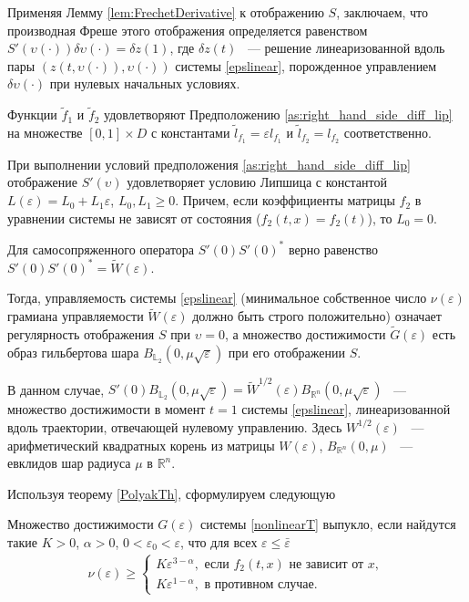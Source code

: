 \documentclass[../main.tex]{subfiles}
\begin{document}
 Применяя Лемму \ref{lem:FrechetDerivative} к отображению $S$, заключаем, что производная Фреше этого отображения определяется равенством $ S'(\upsilon(\cdot))\delta \upsilon(\cdot) = \delta z(1)$, где $\delta z(t)$ ~--- решение линеаризованной вдоль пары $\left( z(t,\upsilon(\cdot)),\upsilon(\cdot)\right)  $ системы \eqref{epslinear}, порожденное управлением $\delta \upsilon(\cdot)$ при нулевых начальных условиях.
 
  Функции  $\widetilde{f}_1$ и $\widetilde{f}_2$ удовлетворяют Предположению \ref{as:right_hand_side_diff_lip} на множестве $[0, 1]\times D$ с константами $\widetilde{l}_{f_1} = \varepsilon l_{f_1} $ и  $\widetilde{l}_{f_2} = l_{f_2} $ соответственно. 
 
 
 При выполнении условий предположения \ref{as:right_hand_side_diff_lip} отображение $S'(\upsilon)$ удовлетворяет условию Липшица с константой $L(\varepsilon) = L_0 + L_1\varepsilon$, $ L_0, L_1 \geqslant 0 $. Причем, если коэффициенты матрицы $f_2$ в уравнении системы не зависят от состояния ($f_2(t,x) = f_2(t)$), то $L_0 = 0$. 
  
  Для самосопряженного оператора $S'(0)S'(0)^*$ верно равенство $S'(0)S'(0)^* = \widetilde{W}(\varepsilon)$.
  
   Тогда, управляемость системы \eqref{epslinear} (минимальное собственное число $ \nu(\varepsilon) $ грамиана управляемости $\widetilde{W}(\varepsilon)$ должно быть строго положительно) означает регулярность отображения $S$ при $\upsilon = 0$, а множество достижимости $\widetilde{G}(\varepsilon)$ есть образ гильбертова шара $B_{\mathbb{L}_2}(0,\mu\sqrt{\varepsilon})$ при его отображении $S$.
   
   В данном случае, $S'(0)B_{\mathbb{L}_2}(0,\mu\sqrt{\varepsilon}) = \widetilde{W}^{1/2}(\varepsilon)B_{\mathbb{R}^n}(0,\mu\sqrt{\varepsilon}) $ ~--- множество достижимости в момент $t = 1$ системы \eqref{epslinear}, линеаризованной вдоль траектории, отвечающей нулевому управлению. Здесь $W^{1/2}(\varepsilon)$ ~--- арифметический квадратных корень из матрицы $W(\varepsilon)$, $ B_{\mathbb{R}^n}(0,\mu) $ ~--- евклидов шар радиуса $ \mu $ в $ \mathbb{R}^n $.
 
 Используя теорему \ref{PolyakTh}, сформулируем следующую
 \begin{theorem}\label{ConvexityCond}
 	Множество достижимости $G(\varepsilon)$ системы \eqref{nonlinearT} выпукло, если найдутся такие $K > 0$, $ \alpha > 0$, $ 0 < \varepsilon_0 < \varepsilon$, что для всех $\varepsilon \leqslant \bar{\varepsilon}$
 		\begin{gather}\label{cond}
 			\nu(\varepsilon) \geqslant \left\{ {\begin{array}{*{20}{l}}
 					{K\varepsilon ^{3 - \alpha}, \mbox{\ если \ } f_2(t,x) \mbox{\ не зависит от \ } x}, \\
 					{K\varepsilon ^{1 - \alpha}}, \mbox{\ в противном случае}.
 			\end{array}} \right.
 		\end{gather}
 \end{theorem}
 
\end{document}
